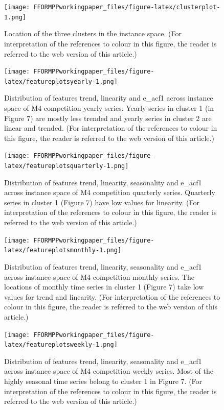 \documentclass[11pt,a4paper,]{article}
\begin{document}
\begin{figure}
\centering
\texttt{[image: FFORMPPworkingpaper\_files/figure-latex/clusterplot-1.png]}
\caption{\label{fig:clusterplot}Location of the three clusters in the instance space. (For interpretation of the references to colour in this figure, the reader is referred to the web version of this article.)}
\end{figure}

\begin{figure}
\centering
\texttt{[image: FFORMPPworkingpaper\_files/figure-latex/featureplotsyearly-1.png]}
\caption{\label{fig:featureplotsyearly}Distribution of features trend, linearity and e\_acf1 across instance space of M4 competition yearly series. Yearly series in cluster 1 (in Figure 7) are mostly less trended and yearly series in cluster 2 are linear and trended. (For interpretation of the references to colour in this figure, the reader is referred to the web version of this article.)}
\end{figure}

\begin{figure}
\centering
\texttt{[image: FFORMPPworkingpaper\_files/figure-latex/featureplotsquarterly-1.png]}
\caption{\label{fig:featureplotsquarterly}Distribution of features trend, linearity, seasonality and e\_acf1 across instance space of M4 competition quarterly series. Quarterly series in cluster 1 (Figure 7) have low values for linearity. (For interpretation of the references to colour in this figure, the reader is referred to the web version of this article.)}
\end{figure}

\begin{figure}
\centering
\texttt{[image: FFORMPPworkingpaper\_files/figure-latex/featureplotsmonthly-1.png]}
\caption{\label{fig:featureplotsmonthly}Distribution of features trend, linearity, seasonality and e\_acf1 across instance space of M4 competition monthly series. The locations of monthly time series in cluster 1 (Figure 7) take low values for trend and linearity. (For interpretation of the references to colour in this figure, the reader is referred to the web version of this article.)}
\end{figure}

\begin{figure}
\centering
\texttt{[image: FFORMPPworkingpaper\_files/figure-latex/featureplotsweekly-1.png]}
\caption{\label{fig:featureplotsweekly}Distribution of features trend, linearity, seasonality and e\_acf1 across instance space of M4 competition weekly series. Most of the highly seasonal time series belong to cluster 1 in Figure 7. (For interpretation of the references to colour in this figure, the reader is referred to the web version of this article.)}
\end{figure}
\end{document}
